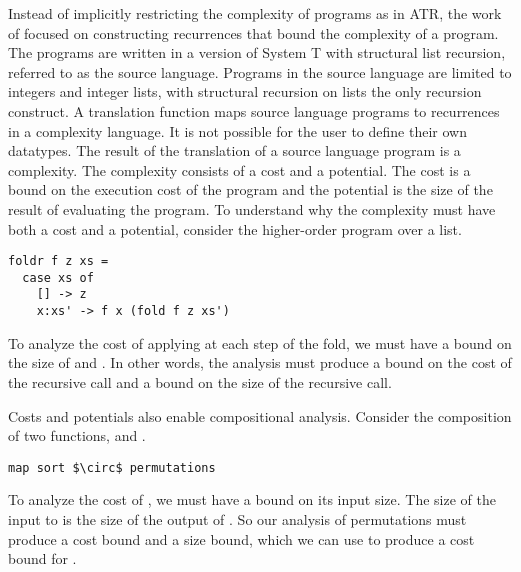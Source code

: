 Instead of implicitly restricting the complexity of programs as in ATR, the work of
\citet{Danner2013} focused on constructing recurrences that bound the
complexity of a program. The programs are written in a version of System T with
structural list recursion, referred to as the source language.  Programs in the
source language are limited to integers and integer lists, with structural
recursion on lists the only recursion construct.  A translation function maps
source language programs to recurrences in a complexity language.  It is not
possible for the user to define their own datatypes. The result of the
translation of a source language program is a complexity. The complexity
consists of a cost and a potential. The cost is a bound on the execution cost
of the program and the potential is the size of the result of evaluating the
program. To understand why the complexity must have both a cost and a
potential, consider the higher-order program  over a list.
%
\begin{lstlisting}
foldr f z xs =
  case xs of
    [] -> z
    x:xs' -> f x (fold f z xs')
\end{lstlisting}
%
To analyze the cost of applying  at each step of the fold, we must have a
bound on the size of  and . In other words, the analysis
must produce a bound on the cost of the recursive call and a bound on the
size of the recursive call.

Costs and potentials also enable compositional analysis. Consider the
composition of two functions,  and .
%
\begin{lstlisting}
map sort $\circ$ permutations
\end{lstlisting}
%
To analyze the cost of , we must have a bound on its input size.
The size of the input to  is the size of the output of
. So our analysis of permutations must produce a cost bound and
a size bound, which we can use to produce a cost bound for .



